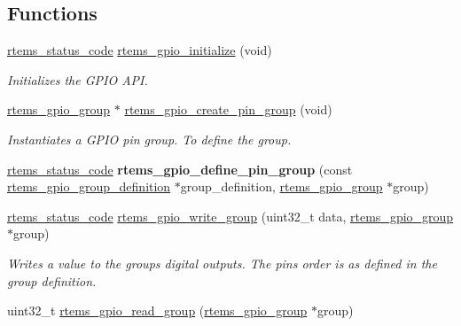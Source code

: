\subsection*{Functions}
\begin{DoxyCompactItemize}
\item 
\mbox{\hyperlink{group__ClassicStatus_ga545d41846817eaba6143d52ee4d9e9fe}{rtems\+\_\+status\+\_\+code}} \mbox{\hyperlink{gpio-support_8c_a569b507754f117c929de86f9ea24c27b}{rtems\+\_\+gpio\+\_\+initialize}} (void)
\begin{DoxyCompactList}\small\item\em Initializes the G\+P\+IO A\+PI. \end{DoxyCompactList}\item 
\mbox{\hyperlink{structrtems__gpio__group}{rtems\+\_\+gpio\+\_\+group}} $\ast$ \mbox{\hyperlink{gpio-support_8c_aebb1cf0d1a0a8997ff47df3e9f66eeeb}{rtems\+\_\+gpio\+\_\+create\+\_\+pin\+\_\+group}} (void)
\begin{DoxyCompactList}\small\item\em Instantiates a G\+P\+IO pin group. To define the group. \end{DoxyCompactList}\item 
\mbox{\label{gpio-support_8c_ae1f53fbcb3890d7c55df0ae3d41c61ed}} 
\mbox{\hyperlink{group__ClassicStatus_ga545d41846817eaba6143d52ee4d9e9fe}{rtems\+\_\+status\+\_\+code}} {\bfseries rtems\+\_\+gpio\+\_\+define\+\_\+pin\+\_\+group} (const \mbox{\hyperlink{structrtems__gpio__group__definition}{rtems\+\_\+gpio\+\_\+group\+\_\+definition}} $\ast$group\+\_\+definition, \mbox{\hyperlink{structrtems__gpio__group}{rtems\+\_\+gpio\+\_\+group}} $\ast$group)
\item 
\mbox{\hyperlink{group__ClassicStatus_ga545d41846817eaba6143d52ee4d9e9fe}{rtems\+\_\+status\+\_\+code}} \mbox{\hyperlink{gpio-support_8c_ab47ad2030469bd1d81dd6506ffe09df2}{rtems\+\_\+gpio\+\_\+write\+\_\+group}} (uint32\+\_\+t data, \mbox{\hyperlink{structrtems__gpio__group}{rtems\+\_\+gpio\+\_\+group}} $\ast$group)
\begin{DoxyCompactList}\small\item\em Writes a value to the group\textquotesingle{}s digital outputs. The pins order is as defined in the group definition. \end{DoxyCompactList}\item 
uint32\+\_\+t \mbox{\hyperlink{gpio-support_8c_a2c5e4518cabe5b0a8ac570ea20a98417}{rtems\+\_\+gpio\+\_\+read\+\_\+group}} (\mbox{\hyperlink{structrtems__gpio__group}{rtems\+\_\+gpio\+\_\+group}} $\ast$group)

\end{DoxyCompactItemize}
